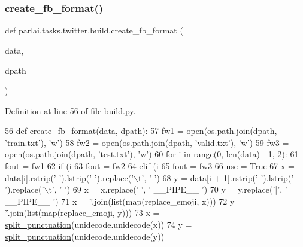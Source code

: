 \subsubsection{\texorpdfstring{create\+\_\+fb\+\_\+format()}{create\_fb\_format()}}
{\footnotesize\ttfamily def parlai.\+tasks.\+twitter.\+build.\+create\+\_\+fb\+\_\+format (\begin{DoxyParamCaption}\item[{}]{data,  }\item[{}]{dpath }\end{DoxyParamCaption})}



Definition at line 56 of file build.\+py.


\begin{DoxyCode}
56 \textcolor{keyword}{def }\hyperlink{namespaceparlai_1_1tasks_1_1wikiqa_1_1build_a554828702769592403db58c955d1dfe3}{create\_fb\_format}(data, dpath):
57     fw1 = open(os.path.join(dpath, \textcolor{stringliteral}{'train.txt'}), \textcolor{stringliteral}{'w'})
58     fw2 = open(os.path.join(dpath, \textcolor{stringliteral}{'valid.txt'}), \textcolor{stringliteral}{'w'})
59     fw3 = open(os.path.join(dpath, \textcolor{stringliteral}{'test.txt'}), \textcolor{stringliteral}{'w'})
60     \textcolor{keywordflow}{for} i \textcolor{keywordflow}{in} range(0, len(data) - 1, 2):
61         fout = fw1
62         \textcolor{keywordflow}{if} (i %
63             fout = fw2
64         \textcolor{keywordflow}{elif} (i %
65             fout = fw3
66         use = \textcolor{keyword}{True}
67         x = data[i].rstrip(\textcolor{stringliteral}{' '}).lstrip(\textcolor{stringliteral}{' '}).replace(\textcolor{stringliteral}{'\(\backslash\)t'}, \textcolor{stringliteral}{' '})
68         y = data[i + 1].rstrip(\textcolor{stringliteral}{' '}).lstrip(\textcolor{stringliteral}{' '}).replace(\textcolor{stringliteral}{'\(\backslash\)t'}, \textcolor{stringliteral}{' '})
69         x = x.replace(\textcolor{stringliteral}{'|'}, \textcolor{stringliteral}{' \_\_PIPE\_\_ '})
70         y = y.replace(\textcolor{stringliteral}{'|'}, \textcolor{stringliteral}{' \_\_PIPE\_\_ '})
71         x = \textcolor{stringliteral}{''}.join(list(map(replace\_emoji, x)))
72         y = \textcolor{stringliteral}{''}.join(list(map(replace\_emoji, y)))
73         x = \hyperlink{namespaceparlai_1_1tasks_1_1twitter_1_1build_a6296215f669301c1e46b7588e1291ae7}{split\_punctuation}(unidecode.unidecode(x))
74         y = \hyperlink{namespaceparlai_1_1tasks_1_1twitter_1_1build_a6296215f669301c1e46b7588e1291ae7}{split\_punctuation}(unidecode.unidecode(y))

\end{DoxyCode}
